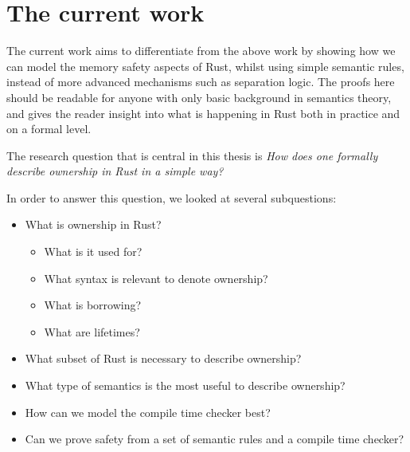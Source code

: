 \section{The current work}
The current work aims to differentiate from the above work by showing how we can model the memory safety aspects of Rust, whilst using simple semantic rules, instead of more advanced mechanisms such as separation logic. The proofs here should be readable for anyone with only basic background in semantics theory, and gives the reader insight into what is happening in Rust both in practice and on a formal level. 

The research question that is central in this thesis is \emph{How does one formally describe ownership in Rust in a simple way?}

In order to answer this question, we looked at several subquestions:

\begin{itemize}[noitemsep]
    \item What is ownership in Rust?
    \begin{itemize}[noitemsep]
        \item What is it used for?
        \item What syntax is relevant to denote ownership?
        \item What is borrowing?
        \item What are lifetimes?
    \end{itemize}
    \item What subset of Rust is necessary to describe ownership?
    \item What type of semantics is the most useful to describe ownership?
    \item How can we model the compile time checker best?
    \item Can we prove safety from a set of semantic rules and a compile time checker?
\end{itemize}



